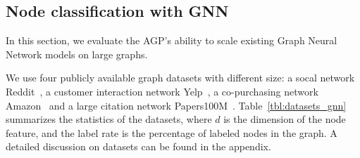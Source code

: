 \vspace{-2mm}
\subsection{Node classification with GNN}\label{subsec:GNN}
In this section, we evaluate the AGP's ability to scale  existing Graph Neural Network models on large graphs.

We use four publicly available graph datasets with different size: a socal network Reddit~\cite{hamilton2017graphSAGE}, a customer interaction network Yelp~\cite{zeng2019graphsaint}, a co-purchasing network Amazon~\cite{chiang2019clusterGCN} and a large citation network Papers100M~\cite{hu2020ogb}. Table~\ref{tbl:datasets_gnn} summarizes the statistics of the datasets, where $d$ is the dimension of the node feature, and the label rate is the percentage of labeled nodes in the graph. A detailed discussion on datasets can be found in the appendix. 




